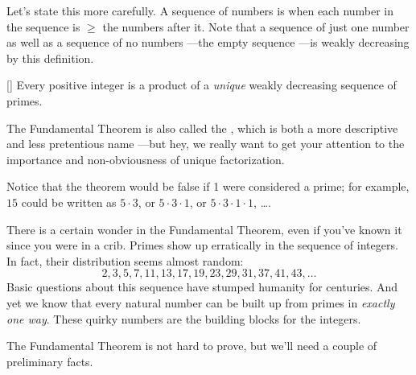 Let's state this more carefully.  A sequence of numbers is
\emph{} when each number in the sequence is
$\ge$ the numbers after it.  Note that a sequence of just one number
as well as a sequence of no numbers ---the empty sequence ---is weakly
decreasing by this definition.

\begin{theorem}\label{thm:unique_factor}[]
Every positive integer is a product of a \emph{unique} weakly decreasing
  sequence of primes.
\end{theorem}

The Fundamental Theorem is also called the , which is both a more descriptive and less pretentious name
---but hey, we really want to get your attention to the importance and
non-obviousness of unique factorization.

Notice that the theorem would be false if 1 were considered a prime;
for example, $15$ could be written as $5 \cdot 3$, or $5 \cdot 3 \cdot
1$, or $5 \cdot 3 \cdot 1 \cdot 1$, \dots.

There is a certain wonder in the Fundamental Theorem, even if you've
known it since you were in a crib.  Primes show up erratically in the
sequence of integers.  In fact, their distribution seems almost
random:
\[
2, 3, 5, 7, 11, 13, 17, 19, 23, 29, 31, 37, 41, 43, \dots
\]
Basic questions about this sequence have stumped humanity for
centuries.  And yet we know that every natural number can be built up
from primes in \emph{exactly one way}.  These quirky numbers are the
building blocks for the integers.

The Fundamental Theorem is not hard to prove, but we'll need a couple
of preliminary facts.

